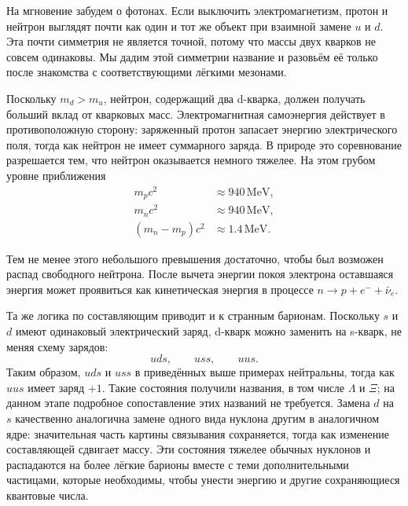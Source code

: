На мгновение забудем о фотонах. Если выключить электромагнетизм, протон и нейтрон выглядят почти как один и тот же объект при взаимной замене \(u\) и \(d\). Эта почти симметрия не является точной, потому что массы двух кварков не совсем одинаковы. Мы дадим этой симметрии название и разовьём её только после знакомства с соответствующими лёгкими мезонами.

Поскольку \(m_d>m_u\), нейтрон, содержащий два d-кварка, должен получать больший вклад от кварковых масс. Электромагнитная самоэнергия действует в противоположную сторону: заряженный протон запасает энергию электрического поля, тогда как нейтрон не имеет суммарного заряда. В природе это соревнование разрешается тем, что нейтрон оказывается немного тяжелее. На этом грубом уровне приближения
\begin{align}
m_pc^2&\approx940\,\mathrm{MeV},\\
m_nc^2&\approx940\,\mathrm{MeV},\\
(m_n-m_p)c^2&\approx1.4\,\mathrm{MeV}.
\end{align}

\begin{classroomqa}
\end{classroomqa}

Тем не менее этого небольшого превышения достаточно, чтобы был возможен распад свободного нейтрона. После вычета энергии покоя электрона оставшаяся энергия может проявиться как кинетическая энергия в процессе \(n\to p+e^-+\bar\nu_e\).

Та же логика по составляющим приводит и к странным барионам. Поскольку \(s\) и \(d\) имеют одинаковый электрический заряд, d-кварк можно заменить на s-кварк, не меняя схему зарядов:
\begin{equation}
uds,\qquad uss,\qquad uus.
\end{equation}
Таким образом, \(uds\) и \(uss\) в приведённых выше примерах нейтральны, тогда как \(uus\) имеет заряд \(+1\). Такие состояния получили названия, в том числе \(\Lambda\) и \(\Xi\); на данном этапе подробное сопоставление этих названий не требуется. Замена \(d\) на \(s\) качественно аналогична замене одного вида нуклона другим в аналогичном ядре: значительная часть картины связывания сохраняется, тогда как изменение составляющей сдвигает массу. Эти состояния тяжелее обычных нуклонов и распадаются на более лёгкие барионы вместе с теми дополнительными частицами, которые необходимы, чтобы унести энергию и другие сохраняющиеся квантовые числа.

